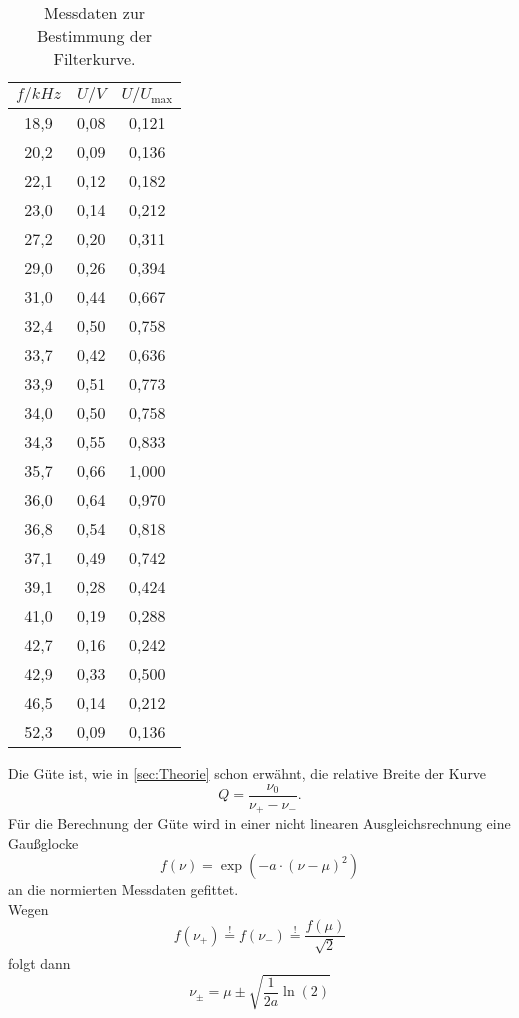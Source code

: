\begin{table}
  \centering
  \caption{Messdaten zur Bestimmung der Filterkurve.}
  \label{tab:filterkurve}
  \begin{tabular}{c c c}
  \toprule
  $f / \si{kHz}$	& $U / \si{V}$ & $U / U_\text{max}$\\
  \midrule
	18,9&0,08&0,121	\\
	20,2&0,09&0,136	\\
	22,1&0,12&0,182	\\
	23,0&0,14&0,212	\\
	27,2&0,20&0,311	\\
	29,0&0,26&0,394	\\
	31,0&0,44&0,667	\\
	32,4&0,50&0,758	\\
	33,7&0,42&0,636	\\
	33,9&0,51&0,773	\\
	34,0&0,50&0,758	\\
	34,3&0,55&0,833	\\
	35,7&0,66&1,000	\\
	36,0&0,64&0,970	\\
	36,8&0,54&0,818	\\
	37,1&0,49&0,742	\\
	39,1&0,28&0,424	\\
	41,0&0,19&0,288	\\
	42,7&0,16&0,242	\\
	42,9&0,33&0,500	\\
	46,5&0,14&0,212	\\
	52,3&0,09&0,136	\\
  \bottomrule
  \end{tabular}
\end{table}
\noindent Die Güte ist, wie in \autoref{sec:Theorie} schon erwähnt, die relative Breite der Kurve
\[
	Q = \frac{\nu_0}{\nu_+ - \nu_-}.
\]
Für die Berechnung der Güte wird in einer nicht linearen Ausgleichsrechnung eine
Gaußglocke
\begin{equation}
	\label{eqn:gauss-glocke}
	f(\nu) = \exp\left(-a \cdot (\nu - \mu)^2\right)
\end{equation}
an die normierten Messdaten gefittet.
\\
Wegen
\begin{equation}
	f(\nu_+) \overset{!}{=} 
	f(\nu_-) \overset{!}{=} 
	\frac{f(\mu)}{\sqrt{2}}
\end{equation}
folgt dann
\begin{equation}
	\label{eqn:nu-plus-minus}
	\nu_\pm = \mu \pm \sqrt{\frac{1}{2a} \ln(2)}
\end{equation}
